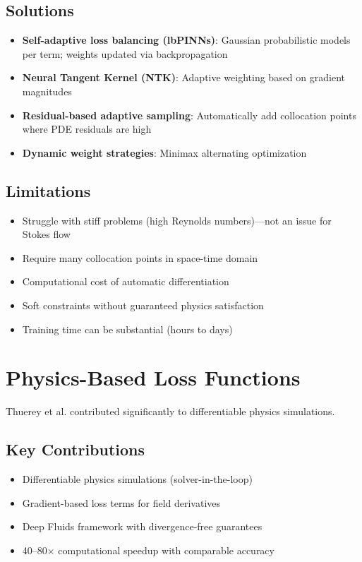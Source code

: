\subsection{Solutions}
\begin{itemize}
    \item \textbf{Self-adaptive loss balancing (lbPINNs)}: Gaussian probabilistic models per term; weights updated via backpropagation
    \item \textbf{Neural Tangent Kernel (NTK)}: Adaptive weighting based on gradient magnitudes
    \item \textbf{Residual-based adaptive sampling}: Automatically add collocation points where PDE residuals are high
    \item \textbf{Dynamic weight strategies}: Minimax alternating optimization
\end{itemize}

\subsection{Limitations}
\begin{itemize}
    \item Struggle with stiff problems (high Reynolds numbers)---not an issue for Stokes flow
    \item Require many collocation points in space-time domain
    \item Computational cost of automatic differentiation
    \item Soft constraints without guaranteed physics satisfaction
    \item Training time can be substantial (hours to days)
\end{itemize}

\section{Physics-Based Loss Functions}

Thuerey et al. \cite{thuerey2020} contributed significantly to differentiable physics simulations.

\subsection{Key Contributions}
\begin{itemize}
    \item Differentiable physics simulations (solver-in-the-loop)
    \item Gradient-based loss terms for field derivatives
    \item Deep Fluids framework with divergence-free guarantees
    \item 40--80$\times$ computational speedup with comparable accuracy
\end{itemize}

